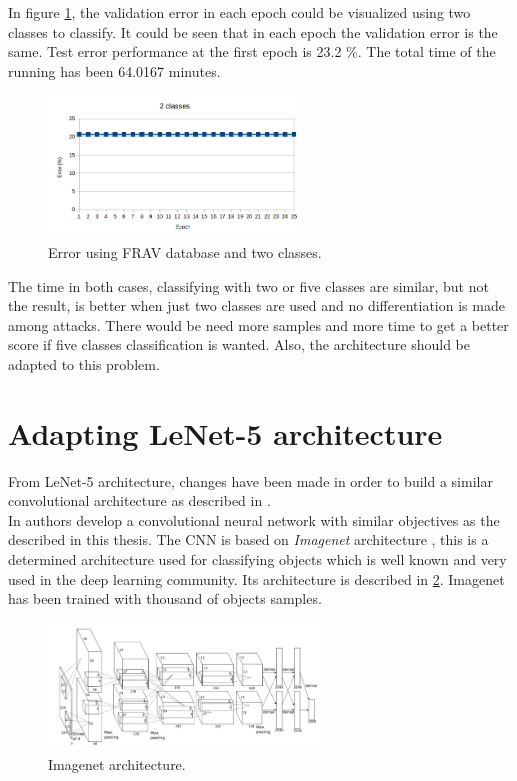 In figure \ref{fig:FRAV_two}, the validation error in each epoch could be visualized using two classes to classify. It could be seen that in each epoch the validation error is the same. Test error performance at the first epoch is 23.2 \%. The total time of the running has been 64.0167 minutes.\\

\begin{figure}[htb]
\centering
\includegraphics[width=0.6\textwidth]{images/epoch_2classes_FRAV_1.png}
\caption{Error using FRAV database and two classes.}
\label{fig:FRAV_two}
\end{figure}

The time in both cases, classifying with two or five classes are similar, but not the result, is better when just two classes are used and no differentiation is made among attacks. There would be need more samples and more time to get a better score if five classes classification is wanted. Also, the architecture should be adapted to this problem.\\



\clearpage
\section{Adapting LeNet-5 architecture}
From LeNet-5 architecture, changes have been made in order to build a similar convolutional architecture as described in \cite{yangLL14}.\\

In \cite{yangLL14} authors develop a convolutional neural network with similar objectives as the described in this thesis. The CNN is based on \textit{Imagenet} architecture \cite{imagenet}, this is a determined architecture used for classifying objects which is well known and very used in the deep learning community. Its architecture is described in \ref{fig:Imagenet_architecture}. Imagenet has been trained with thousand of objects samples.\\

\begin{figure}[htb]
\centering
\includegraphics[width=0.65\textwidth]{images_miscelaneus/Imagenet.png}
\caption{Imagenet architecture.} \label{fig:Imagenet_architecture}
\end{figure}

